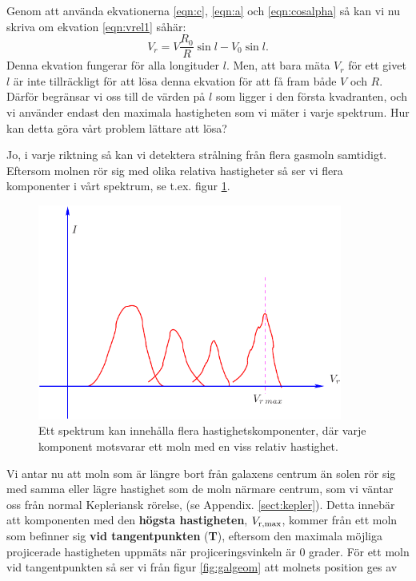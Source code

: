 Genom att använda ekvationerna \ref{eqn:c}, \ref{eqn:a} och \ref{eqn:cosalpha}
så kan vi nu skriva om ekvation \ref{eqn:vrel1} såhär:
\begin{equation}
\boxed{V_r = V \frac{R_0}{R}\sin l - V_0 \sin l .}
\label{eqn:vrel2}
\end{equation}
Denna ekvation fungerar för alla longituder $l$. Men, att bara mäta $V_r$ för ett
givet $l$ är inte tillräckligt för att lösa denna ekvation för att få fram
både $V$ och $R$. Därför begränsar vi oss till de värden på $l$ som ligger
i den första kvadranten, och vi använder endast den maximala hastigheten
som vi mäter i varje spektrum. Hur kan detta göra vårt problem lättare att lösa?

Jo, i varje riktning så kan vi detektera strålning från flera gasmoln samtidigt.
Eftersom molnen rör sig med olika relativa hastigheter så ser vi flera komponenter
i vårt spektrum, se t.ex. figur \ref{fig:vmax}. 
\begin{figure}[ht]
\begin{center}
\includegraphics[width=10cm]{../figures/vmax.pdf}
\end{center}
\caption{Ett spektrum kan innehålla flera hastighetskomponenter, där varje
	komponent motsvarar ett moln med en viss relativ hastighet.}
\label{fig:vmax}
\end{figure}
Vi antar nu att moln som är längre bort från galaxens centrum än solen rör
sig med samma eller lägre hastighet som de moln närmare centrum, som vi 
väntar oss från normal Kepleriansk rörelse, (se Appendix. \ref{sect:kepler}).  
Detta innebär att komponenten med den {\bf högsta hastigheten}, $V_{\rm r,max}$, 
kommer från ett moln som befinner sig {\bf vid tangentpunkten } ({\bf T}), 
eftersom den maximala möjliga projicerade hastigheten uppmäts när
projiceringsvinkeln är 0 grader. För ett moln vid tangentpunkten
så ser vi från figur \ref{fig:galgeom} att molnets position ges av  
